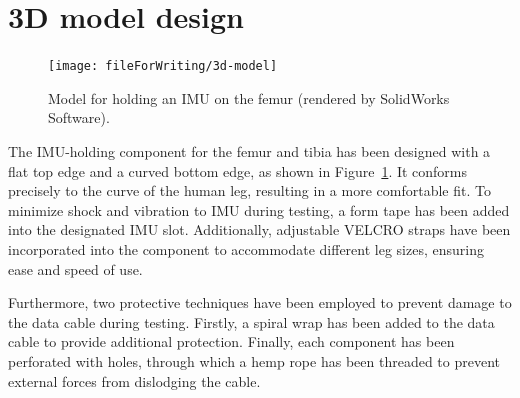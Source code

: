 \section{3D model design}

\begin{figure}[htbp]
	\centering
	\texttt{[image: 
		fileForWriting/3d-model]}
	\caption[Model for holding an IMU on the femur]{Model for holding an IMU on the femur (rendered by SolidWorks Software).}
	\label{fig:3d-model}
\end{figure}


The IMU-holding component for the femur and tibia has been designed with a flat top edge and a curved bottom edge, as shown in Figure~\ref{fig:3d-model}.
It conforms precisely to the curve of the human leg, resulting in a more comfortable fit.
To minimize shock and vibration to IMU during testing, a form tape has been added into the designated IMU slot.
Additionally, adjustable VELCRO straps have been incorporated into the component to accommodate different leg sizes, ensuring ease and speed of use.

Furthermore, two protective techniques have been employed to prevent damage to the data cable during testing.
Firstly, a spiral wrap has been added to the data cable to provide additional protection.
Finally, each component has been perforated with holes, through which a hemp rope has been threaded to prevent external forces from dislodging the cable.
